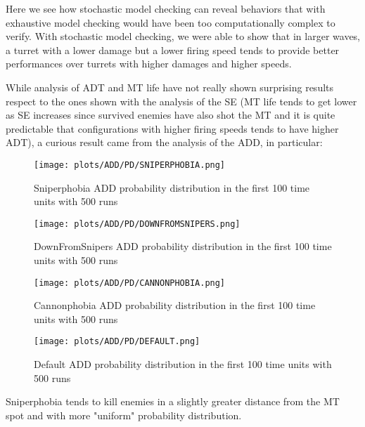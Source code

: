 \documentclass[
10pt, %
a4paper, %
oneside, %
headinclude,footinclude, %
BCOR5mm, %
]{scrartcl}
\begin{document}
			Here we see how stochastic model checking can reveal behaviors that with exhaustive model checking would have been too computationally complex to verify. With stochastic model checking, we were able to show that in larger waves, a turret with a lower damage but a lower firing speed tends to provide better performances over turrets with higher damages and higher speeds.
			
			While analysis of ADT and MT life have not really shown surprising results respect to the ones shown with the analysis of the SE (MT life tends to get lower as SE increases since survived enemies have also shot the MT and it is quite predictable that configurations with higher firing speeds tends to have higher ADT), a curious result came from the analysis of the ADD, in particular:
			\begin{figure}[H]
				\centering
				\begin{minipage}{.4\textwidth}
					\centering
					\texttt{[image: plots/ADD/PD/SNIPERPHOBIA.png]}
					\caption{Sniperphobia ADD probability distribution in the first 100 time units with 500 runs}
				\end{minipage}
				\begin{minipage}{.4\textwidth}
					\centering
					\texttt{[image: plots/ADD/PD/DOWNFROMSNIPERS.png]}
					\caption{DownFromSnipers ADD probability distribution in the first 100 time units with 500 runs}
				\end{minipage}
			\end{figure}
			\begin{figure}[H]
				\centering
				\begin{minipage}{.4\textwidth}
					\centering
					\texttt{[image: plots/ADD/PD/CANNONPHOBIA.png]}
					\caption{Cannonphobia ADD probability distribution in the first 100 time units with 500 runs}
				\end{minipage}
				\begin{minipage}{.4\textwidth}
					\centering
					\texttt{[image: plots/ADD/PD/DEFAULT.png]}
					\caption{Default ADD probability distribution in the first 100 time units with 500 runs}
				\end{minipage}
			\end{figure}
			Sniperphobia tends to kill enemies in a slightly greater distance from the MT spot and with more "uniform" probability distribution.
			
\end{document}
